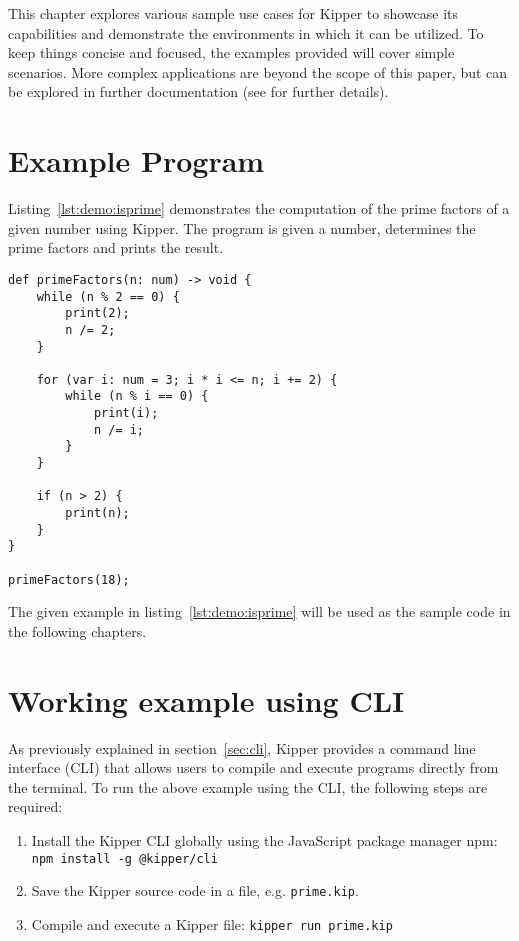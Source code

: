 
This chapter explores various sample use cases for Kipper to showcase its capabilities and demonstrate the environments in which it can be utilized. To keep things concise and focused, the examples provided will cover simple scenarios. More complex applications are beyond the scope of this paper, but can be explored in further documentation (see  for further details).

\section{Example Program}

Listing~\ref{lst:demo:isprime} demonstrates the computation of the prime factors of a given number using Kipper. The program is given a number, determines the prime factors and prints the result.

\begin{lstlisting}[language=Kipper,caption=A basic programs that determines the prime factors of an integer, label=lst:demo:isprime]
def primeFactors(n: num) -> void {
	while (n % 2 == 0) {
		print(2);
		n /= 2;
	}
	
	for (var i: num = 3; i * i <= n; i += 2) {
		while (n % i == 0) {
			print(i);
			n /= i;
		}
	}
	
	if (n > 2) {
		print(n);
	}
}

primeFactors(18);
\end{lstlisting}

The given example in listing~\ref{lst:demo:isprime} will be used as the sample code in the following chapters.

\section{Working example using CLI}

As previously explained in section~\ref{sec:cli}, Kipper provides a command line interface (CLI) that allows users to compile and execute programs directly from the terminal. To run the above example using the CLI, the following steps are required:

\begin{enumerate}
	\item Install the Kipper CLI globally using the JavaScript package manager npm: \lstinline|npm install -g @kipper/cli|
	\item Save the Kipper source code in a file, e.g. \texttt{prime.kip}.
	\item Compile and execute a Kipper file: \lstinline|kipper run prime.kip|
\end{enumerate}

